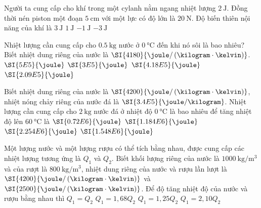 \begin{ex}
	Người ta cung cấp cho khí trong một cylanh nằm ngang nhiệt lượng $\SI{2}{\joule}$. Đồng thời nén piston một đoạn $\SI{5}{\centi\meter}$ với một lực có độ lớn là $\SI{20}{\newton}$. Độ biến thiên nội năng của khí là
	\choice
	{\True $\SI{3}{\joule}$}
	{$\SI{1}{\joule}$}
	{$\SI{-1}{\joule}$}
	{$\SI{-3}{\joule}$}
\end{ex}
\begin{ex}
	Nhiệt lượng cần cung cấp cho $\SI{0.5}{\kilogram}$ nước ở $\SI{0}{\celsius}$ đến khi nó sôi là bao nhiêu? Biết nhiệt dung riêng của nước là $\SI{4180}{\joule/\left(\kilogram\cdot\kelvin\right)}$.
	\choice
	{$\SI{5E5}{\joule}$}
	{$\SI{3E5}{\joule}$}
	{$\SI{4.18E5}{\joule}$}
	{\True $\SI{2.09E5}{\joule}$}
\end{ex}
\begin{ex}
	Biết nhiệt dung riêng của nước là $\SI{4200}{\joule/\left(\kilogram\cdot\kelvin\right)}$, nhiệt nóng chảy riêng của nước đá là $\SI{3.4E5}{\joule/\kilogram}$. Nhiệt lượng cần cung cấp cho $\SI{2}{\kilogram}$ nước đá ở nhiệt độ $\SI{0}{\celsius}$ là bao nhiêu để tăng nhiệt độ lên $\SI{60}{\celsius}$ là
	\choice
	{$\SI{0.72E6}{\joule}$}
	{\True $\SI{1.184E6}{\joule}$}
	{$\SI{2.254E6}{\joule}$}
	{$\SI{1.548E6}{\joule}$}
\end{ex}
\begin{ex}
Một lượng nước và một lượng rượu có thể tích bằng nhau, được cung cấp các nhiệt lượng tương ứng là $Q_1$ và $Q_2$. Biết khối lượng riêng của nước là $\SI{1000}{\kilogram/\meter^3}$ và của rượt là $\SI{800}{\kilogram/\meter^3}$, nhiệt dung riêng của nước và rượu lần lượt là $\SI{4200}{\joule/\left(\kilogram\cdot\kelvin\right)}$ và $\SI{2500}{\joule/\left(\kilogram\cdot\kelvin\right)}$. Để độ tăng nhiệt độ của nước và rượu bằng nhau thì
	\choice
	{$Q_1=Q_2$}
	{$Q_1=1,68Q_2$}
	{$Q_1=1,25Q_2$}
	{\True $Q_1=2,10Q_2$}
\end{ex}
